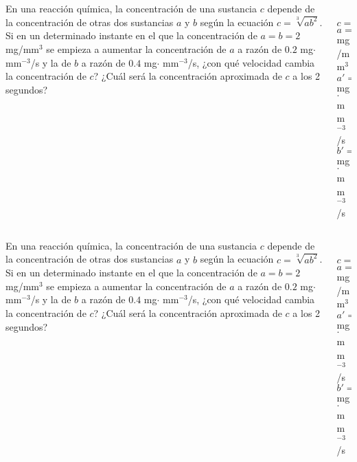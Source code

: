 \documentclass[aspectratio=149,10pt,xcolor=dvipsnames,t]{beamer}
\begin{document}
\begin{frame}
\begin{columns}
\begin{column}[T]{0.75\textwidth}
En una reacción química, la concentración de una sustancia $c$ depende de la concentración de otras dos sustancias $a$ y $b$
según la ecuación $c=\sqrt[3]{ab^2}$. 
Si en un determinado instante en el que la concentración de $a=b=2$ mg/mm$^3$ se empieza a aumentar la concentración de $a$ a razón de $0.2$ mg$\cdot$ mm$^{-3}$/s y la de $b$ a razón de $0.4$ mg$\cdot$ mm$^{-3}$/s, ¿con qué velocidad cambia la
concentración de $c$? 
¿Cuál será la concentración aproximada de $c$ a los 2 segundos?
\end{column}
\begin{column}[T]{0.25\textwidth}
\\
$c=\sqrt[3]{ab^2}$\\
$a=b=2$ mg/mm$^3$\\
$a'= 0.2$ mg$\cdot$ mm$^{-3}$/s\\
$b'= 0.4$ mg$\cdot$ mm$^{-3}$/s
\end{column}
\end{columns}
\end{frame}


\begin{frame}
\begin{columns}
\begin{column}[T]{0.75\textwidth}
En una reacción química, la concentración de una sustancia $c$ depende de la concentración de otras dos sustancias $a$ y $b$
según la ecuación $c=\sqrt[3]{ab^2}$. 
Si en un determinado instante en el que la concentración de $a=b=2$ mg/mm$^3$ se empieza a aumentar la concentración de $a$ a razón de $0.2$ mg$\cdot$ mm$^{-3}$/s y la de $b$ a razón de $0.4$ mg$\cdot$ mm$^{-3}$/s, ¿con qué velocidad cambia la
concentración de $c$? 
¿Cuál será la concentración aproximada de $c$ a los 2 segundos?
\end{column}
\begin{column}[T]{0.25\textwidth}
\\
$c=\sqrt[3]{ab^2}$\\
$a=b=2$ mg/mm$^3$\\
$a'= 0.2$ mg$\cdot$ mm$^{-3}$/s\\
$b'= 0.4$ mg$\cdot$ mm$^{-3}$/s
\end{column}
\end{columns}
\end{frame}
\end{document}

